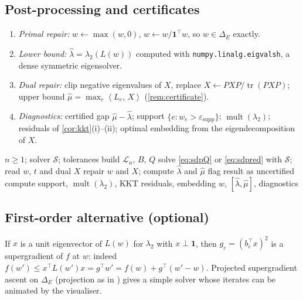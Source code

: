 \documentclass[11pt,a4paper]{article}
\newif\ifdraftnotes
\newcommand{\todo}[1]{\ifdraftnotes{\color{red!70!black}\sffamily[TODO: #1]}\fi}
\theoremstyle{plain}
\theoremstyle{definition}
\theoremstyle{remark}
\newcommand{\one}{\mathbf{1}}
\newcommand{\ip}[2]{\left\langle #1,\, #2 \right\rangle}
\newcommand{\simplex}{\Delta}
\newcommand{\Lad}{\mathcal{L}}            %
\newcommand{\code}[1]{\texttt{#1}}
\DeclareMathOperator{\tr}{tr}
\DeclareMathOperator{\mult}{mult}
\begin{document}
	\subsection{Post-processing and certificates}\label{sec:postprocessing}
	\begin{enumerate}
		\item \emph{Primal repair:} $w\leftarrow\max(w,0)$,
		$w\leftarrow w/\one^\top w$, so $w\in\simplex_E$ exactly.
		\item \emph{Lower bound:} $\hat\lambda=\lambda_2(L(w))$ computed with
		\code{numpy.linalg.eigvalsh}, a dense symmetric eigensolver.
		\item \emph{Dual repair:} clip negative eigenvalues of $X$, replace
		$X\leftarrow PXP/\tr(PXP)$; upper bound
		$\hat\mu=\max_e\ip{L_e}{X}$ (\cref{rem:certificate}).
		\item \emph{Diagnostics:} certified gap $\hat\mu-\hat\lambda$; support
		$\{e:w_e>\varepsilon_{\mathrm{supp}}\}$; $\mult(\lambda_2)$;
		residuals of \cref{cor:kkt}(i)--(ii); optimal embedding from
		the eigendecomposition of $X$.
	\end{enumerate}
	
	\begin{algorithm}[ht]
		\caption{Solve and certify \eqref{eq:P} for $\Lad_n$}\label{alg:solve}
		\begin{algorithmic}[1]
			\Require $n\ge1$; solver $\mathcal S$; tolerances
			\State build $\Lad_n$, $B$, $Q$ \Comment{\code{ladder.py}, \code{laplacian.py}}
			\State solve \eqref{eq:sdpQ} or \eqref{eq:sdpred} with $\mathcal S$;
			read $w$, $t$ and dual $X$
			\State repair $w$ and $X$; compute $\hat\lambda$ and $\hat\mu$
			\State flag result as uncertified \Comment{\todo{policy}}
			\EndIf
			\State compute support, $\mult(\lambda_2)$, KKT residuals, embedding
			\State \Return $w$, $[\hat\lambda,\hat\mu]$, diagnostics
		\end{algorithmic}
	\end{algorithm}
	
	\subsection{First-order alternative (optional)}\label{sec:firstorder}
	If $x$ is a unit eigenvector of $L(w)$ for $\lambda_2$ with $x\perp\one$,
	then $g_e=(b_e^\top x)^2$ is a supergradient of $f$ at $w$: indeed
	$f(w')\le x^\top L(w')x=g^\top w'=f(w)+g^\top(w'-w)$. Projected
	supergradient ascent on $\simplex_E$ (projection as in
	\cite{DuchiShalevShwartzSingerChandra2008}) gives a simple solver whose
	iterates can be animated by the visualiser. \todo{Step sizes,
		convergence guarantee, comparison with CVXPY.}
	
\end{document}
